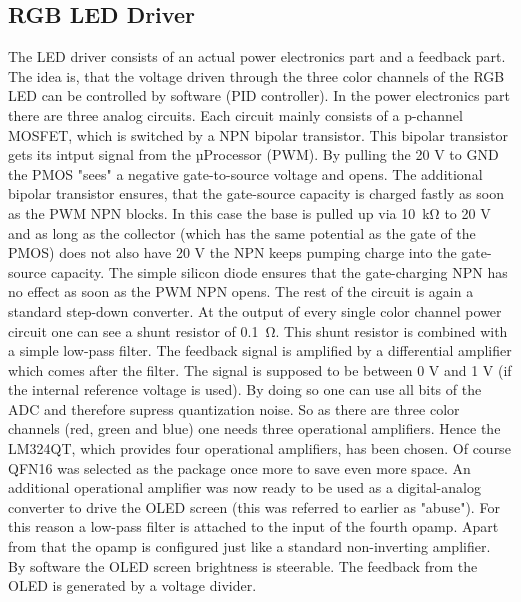 \subsection{RGB LED Driver}
The LED driver consists of an actual power electronics part and a feedback part. The idea is, that the voltage driven through the three color channels of the RGB LED can be controlled by software (PID controller). In the power electronics part there are three analog circuits. Each circuit mainly consists of a p-channel MOSFET, which is switched by a NPN bipolar transistor. This bipolar transistor gets its intput signal from the µProcessor (PWM). By pulling the 20 V to GND the PMOS "sees" a negative gate-to-source voltage and opens. The additional bipolar transistor ensures, that the gate-source capacity is charged fastly as soon as the PWM NPN blocks. In this case the base is pulled up via \SI{10}{\kilo\ohm} to 20 V and as long as the collector (which has the same potential as the gate of the PMOS) does not also have 20 V the NPN keeps pumping charge into the gate-source capacity. The simple silicon diode ensures that the gate-charging NPN has no effect as soon as the PWM NPN opens. The rest of the circuit is again a standard step-down converter. At the output of every single color channel power circuit one can see a shunt resistor of \SI{0.1}{\ohm}. This shunt resistor is combined with a simple low-pass filter. The feedback signal is amplified by a differential amplifier which comes after the filter. The signal is supposed to be between 0 V and 1 V (if the internal reference voltage is used). By doing so one can use all bits of the ADC and therefore supress quantization noise. 
\newpar
So as there are three color channels (red, green and blue) one needs three operational amplifiers. Hence the LM324QT, which provides four operational amplifiers, has been chosen. Of course QFN16 was selected as the package once more to save even more space. An additional operational amplifier was now ready to be used as a digital-analog converter to drive the OLED screen (this was referred to earlier as "abuse"). For this reason a low-pass filter is attached to the input of the fourth opamp. Apart from that the opamp is configured just like a standard non-inverting amplifier. By software the OLED screen brightness is steerable. The feedback from the OLED is generated by a voltage divider.                     
